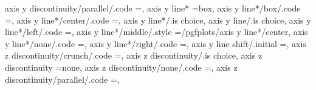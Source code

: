 {{{{{{{{axis y discontinuity/parallel/.code                                ={\def\pgfplots@yaxisdiscontnum{2}},                                                                                                
axis y line*                                                       =box,                                                                                                                               
axis y line*/box/.code                                             ={\def\pgfplots@yaxislinesnum{0}\def\pgfplots@ytickposnum{0}},                                                                      
axis y line*/center/.code                                          ={\def\pgfplots@yaxislinesnum{2}\def\pgfplots@ytickposnum{2}\let\pgfplots@yticklabel@pos\pgfutil@empty},                            
axis y line*/.is choice,
axis y line/.is choice,
axis y line*/left/.code                                            ={\def\pgfplots@yaxislinesnum{1}\def\pgfplots@ytickposnum{1}\let\pgfplots@yticklabel@pos\pgfutil@empty},                            
axis y line*/middle/.style                                         ={/pgfplots/axis y line*/center},                                                                                                   
axis y line*/none/.code                                            ={\def\pgfplots@yaxislinesnum{4}\def\pgfplots@ytickposnum{4}\let\pgfplots@yticklabel@pos\pgfutil@empty},                            
axis y line*/right/.code                                           ={\def\pgfplots@yaxislinesnum{3}\def\pgfplots@ytickposnum{3}\let\pgfplots@yticklabel@pos\pgfutil@empty},                            
axis y line shift/.initial                                         =,                                                                                                                                  
axis z discontinuity/crunch/.code                                  ={\def\pgfplots@zaxisdiscontnum{1}},                                                                                                
axis z discontinuity/.is choice,
axis z discontinuity                                               =none,                                                                                                                              
axis z discontinuity/none/.code                                    ={\def\pgfplots@zaxisdiscontnum{0}},                                                                                                
axis z discontinuity/parallel/.code                                ={\def\pgfplots@zaxisdiscontnum{2}},                                                                                                
}}}}}}}}
